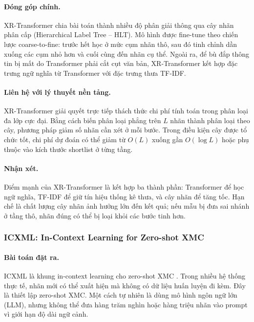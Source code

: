 \paragraph{Đóng góp chính.}
XR-Transformer chia bài toán thành nhiều độ phân giải thông qua cây nhãn phân cấp (Hierarchical Label Tree -- HLT). Mô hình được fine-tune theo chiến lược coarse-to-fine: trước hết học ở mức cụm nhãn thô, sau đó tinh chỉnh dần xuống các cụm nhỏ hơn và cuối cùng đến nhãn cụ thể. Ngoài ra, để bù đắp thông tin bị mất do Transformer phải cắt cụt văn bản, XR-Transformer kết hợp đặc trưng ngữ nghĩa từ Transformer với đặc trưng thưa TF-IDF.

\paragraph{Liên hệ với lý thuyết nền tảng.}
XR-Transformer giải quyết trực tiếp thách thức chi phí tính toán trong phân loại đa lớp cực đại. Bằng cách biến phân loại phẳng trên $L$ nhãn thành phân loại theo cây, phương pháp giảm số nhãn cần xét ở mỗi bước. Trong điều kiện cây được tổ chức tốt, chi phí dự đoán có thể giảm từ $O(L)$ xuống gần $O(\log L)$ hoặc phụ thuộc vào kích thước shortlist ở từng tầng.

\paragraph{Nhận xét.}
Điểm mạnh của XR-Transformer là kết hợp ba thành phần: Transformer để học ngữ nghĩa, TF-IDF để giữ tín hiệu thống kê thưa, và cây nhãn để tăng tốc. Hạn chế là chất lượng cây nhãn ảnh hưởng lớn đến kết quả; nếu mẫu bị đưa sai nhánh ở tầng thô, nhãn đúng có thể bị loại khỏi các bước tinh hơn.

\subsubsection{ICXML: In-Context Learning for Zero-shot XMC}

\paragraph{Bài toán đặt ra.} ICXML là khung in-context learning cho zero-shot XMC \cite{zhu2024icxml}.
Trong nhiều hệ thống thực tế, nhãn mới có thể xuất hiện mà không có dữ liệu huấn luyện đi kèm. Đây là thiết lập zero-shot XMC. Một cách tự nhiên là dùng mô hình ngôn ngữ lớn (LLM), nhưng không thể đưa hàng trăm nghìn hoặc hàng triệu nhãn vào prompt vì giới hạn độ dài ngữ cảnh.

